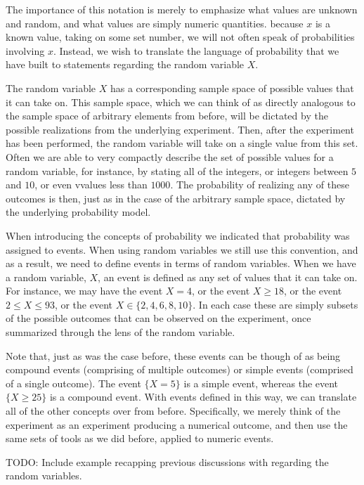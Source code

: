 \documentclass[
  letterpaper,
  DIV=11,
  numbers=noendperiod]{scrreprt}
\begin{document}
The importance of this notation is merely to emphasize what values are
unknown and random, and what values are simply numeric quantities.
because \(x\) is a known value, taking on some set number, we will not
often speak of probabilities involving \(x\). Instead, we wish to
translate the language of probability that we have built to statements
regarding the random variable \(X\).

The random variable \(X\) has a corresponding sample space of possible
values that it can take on. This sample space, which we can think of as
directly analogous to the sample space of arbitrary elements from
before, will be dictated by the possible realizations from the
underlying experiment. Then, after the experiment has been performed,
the random variable will take on a single value from this set. Often we
are able to very compactly describe the set of possible values for a
random variable, for instance, by stating all of the integers, or
integers between \(5\) and \(10\), or even vvalues less than \(1000\).
The probability of realizing any of these outcomes is then, just as in
the case of the arbitrary sample space, dictated by the underlying
probability model.

When introducing the concepts of probability we indicated that
probability was assigned to events. When using random variables we still
use this convention, and as a result, we need to define events in terms
of random variables. When we have a random variable, \(X\), an event is
defined as any set of values that it can take on. For instance, we may
have the event \(X=4\), or the event \(X \geq 18\), or the event
\(2 \leq X \leq 93\), or the event \(X \in \{2,4,6,8,10\}\). In each
case these are simply subsets of the possible outcomes that can be
observed on the experiment, once summarized through the lens of the
random variable.

Note that, just as was the case before, these events can be though of as
being compound events (comprising of multiple outcomes) or simple events
(comprised of a single outcome). The event \(\{X=5\}\) is a simple
event, whereas the event \(\{X \geq 25\}\) is a compound event. With
events defined in this way, we can translate all of the other concepts
over from before. Specifically, we merely think of the experiment as an
experiment producing a numerical outcome, and then use the same sets of
tools as we did before, applied to numeric events.

TODO: Include example recapping previous discussions with regarding the
random variables.
\end{document}

